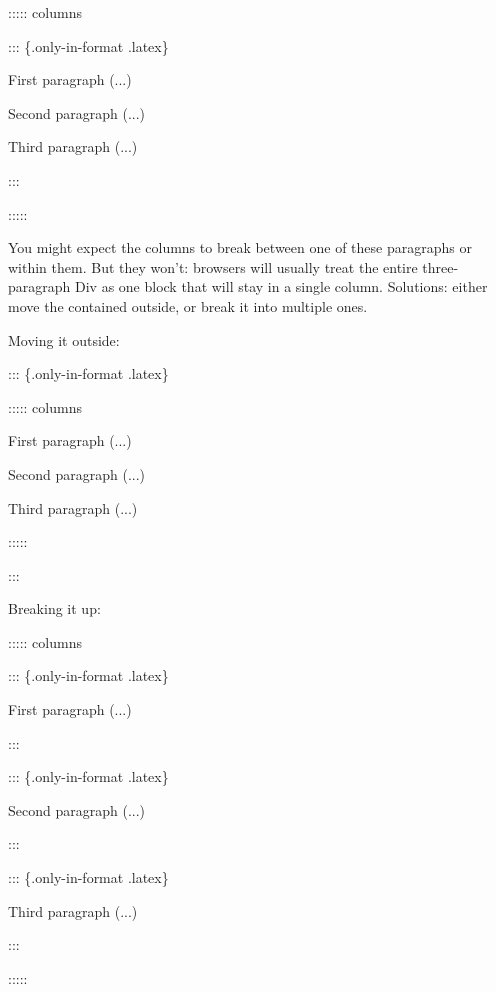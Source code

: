 \documentclass[
]{article}
\newenvironment{Shaded}{}{}
\newcommand{\NormalTok}[1]{#1}
\begin{document}
\begin{Shaded}
\begin{Highlighting}[]
\NormalTok{::::: columns}

\NormalTok{::: \{.only{-}in{-}format .latex\}}

\NormalTok{First paragraph (...)}

\NormalTok{Second paragraph (...)}

\NormalTok{Third paragraph (...)}

\NormalTok{:::}

\NormalTok{:::::}
\end{Highlighting}
\end{Shaded}

You might expect the columns to break between one of these paragraphs or
within them. But they won't: browsers will usually treat the entire
three-paragraph Div as one block that will stay in a single column.
Solutions: either move the contained outside, or break it into multiple
ones.

Moving it outside:

\begin{Shaded}
\begin{Highlighting}[]
\NormalTok{::: \{.only{-}in{-}format .latex\}}

\NormalTok{::::: columns}

\NormalTok{First paragraph (...)}

\NormalTok{Second paragraph (...)}

\NormalTok{Third paragraph (...)}

\NormalTok{:::::}

\NormalTok{:::}
\end{Highlighting}
\end{Shaded}

Breaking it up:

\begin{Shaded}
\begin{Highlighting}[]
\NormalTok{::::: columns}

\NormalTok{::: \{.only{-}in{-}format .latex\}}

\NormalTok{First paragraph (...)}

\NormalTok{:::}

\NormalTok{::: \{.only{-}in{-}format .latex\}}

\NormalTok{Second paragraph (...)}

\NormalTok{:::}

\NormalTok{::: \{.only{-}in{-}format .latex\}}

\NormalTok{Third paragraph (...)}

\NormalTok{:::}

\NormalTok{:::::}
\end{Highlighting}
\end{Shaded}
\end{document}
